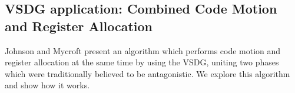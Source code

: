 \subsection*{VSDG application: Combined Code Motion and Register Allocation}

Johnson and Mycroft \cite{johnson-combined} present an algorithm which performs code motion and register allocation at the same time by using the VSDG, uniting two phases which were traditionally believed to be antagonistic. We explore this algorithm and show how it works.


